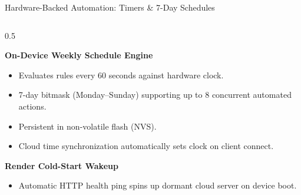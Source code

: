 \documentclass[aspectratio=169, 10pt]{beamer}
\begin{document}
\begin{frame}{Hardware-Backed Automation: Timers \& 7-Day Schedules}
\begin{columns}[T]
        \begin{column}{0.5\textwidth}
            \begin{block}{\textbf{On-Device Weekly Schedule Engine}}
                \begin{itemize}
                    \item Evaluates rules every 60 seconds against hardware clock.
                    \item 7-day bitmask (Monday--Sunday) supporting up to 8 concurrent automated actions.
                    \item Persistent in non-volatile flash (NVS).
                    \item Cloud time synchronization automatically sets clock on client connect.
                \end{itemize}
            \end{block}
            \vspace{0.1cm}
            \begin{block}{\textbf{Render Cold-Start Wakeup}}
                \begin{itemize}
                    \item Automatic HTTP health ping spins up dormant cloud server on device boot.
                \end{itemize}
            \end{block}
        \end{column}
    \end{columns}
\end{frame}
\end{document}
